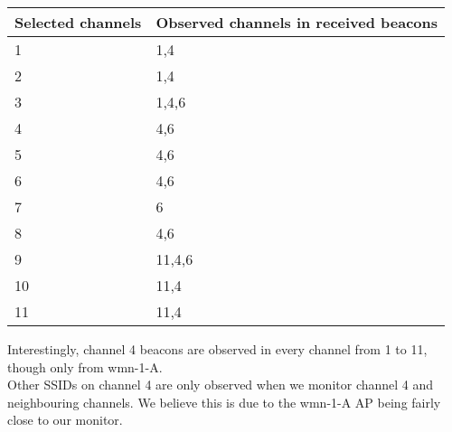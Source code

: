 \begin{tabular}{l | l}
Selected channels & Observed channels in received beacons \\ \hline
1 & 1,4\\ \hline
2 & 1,4\\ \hline
3 & 1,4,6\\ \hline
4 & 4,6\\ \hline
5 & 4,6\\ \hline
6 & 4,6\\ \hline
7 & 6\\ \hline
8 & 4,6\\ \hline
9 & 11,4,6\\ \hline
10 & 11,4\\ \hline
11 & 11,4\\
\end{tabular}
Interestingly, channel 4 beacons are observed in every channel from 1 to 11, though only from wmn-1-A.\\
Other SSIDs on channel 4 are only observed when we monitor channel 4 and neighbouring channels. We believe this is due to the wmn-1-A AP being fairly close to our monitor.
